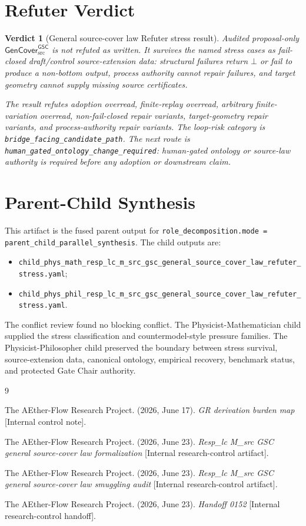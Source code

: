 \documentclass[11pt]{article}
\newcommand{\GenCover}{\mathsf{GenCover}_{\mathrm{src}}^{\mathsf{GSC}}}
\newcommand{\Bot}{\bot}
\newtheorem{verdict}{Verdict}
\begin{document}
\section{Refuter Verdict}

\begin{verdict}[General source-cover law Refuter stress result]
Audited proposal-only \(\GenCover\) is not refuted as written. It survives
the named stress cases as fail-closed draft/control source-extension data:
structural failures return \(\Bot\) or fail to produce a non-bottom output,
process authority cannot repair failures, and target geometry cannot supply
missing source certificates.

The result refutes adoption overread, finite-replay overread, arbitrary
finite-variation overread, non-fail-closed repair variants, target-geometry
repair variants, and process-authority repair variants. The loop-risk
category is \texttt{bridge\_facing\_candidate\_path}. The next route is
\texttt{human\_gated\_ontology\_change\_required}: human-gated ontology or
source-law authority is required before any adoption or downstream claim.
\end{verdict}

\section{Parent-Child Synthesis}

This artifact is the fused parent output for
\texttt{role\_decomposition.mode = parent\_child\_parallel\_synthesis}. The
child outputs are:
\begin{itemize}
  \item \texttt{child\_phys\_math\_resp\_lc\_m\_src\_gsc\_general\_source\_cover\_law\_refuter\_stress.yaml};
  \item \texttt{child\_phys\_phil\_resp\_lc\_m\_src\_gsc\_general\_source\_cover\_law\_refuter\_stress.yaml}.
\end{itemize}
The conflict review found no blocking conflict. The
Physicist-Mathematician child supplied the stress classification and
countermodel-style pressure families. The Physicist-Philosopher child
preserved the boundary between stress survival, source-extension data,
canonical ontology, empirical recovery, benchmark status, and protected Gate
Chair authority.

\begin{thebibliography}{9}

The AEther-Flow Research Project. (2026, June 17). \emph{GR derivation burden
map} [Internal control note].

The AEther-Flow Research Project. (2026, June 23). \emph{Resp\_lc M\_src GSC
general source-cover law formalization} [Internal research-control artifact].

The AEther-Flow Research Project. (2026, June 23). \emph{Resp\_lc M\_src GSC
general source-cover law smuggling audit} [Internal research-control artifact].

The AEther-Flow Research Project. (2026, June 23). \emph{Handoff 0152}
[Internal research-control handoff].

\end{thebibliography}
\end{document}
